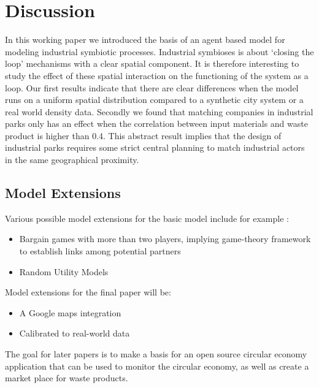 \documentclass[fleqn,10pt]{wlscirep}
\begin{document}
{%









\section*{Discussion}
In this working paper we introduced the basis of an agent based model for modeling industrial symbiotic processes. Industrial symbioses is about `closing the loop' mechanisms with a clear spatial component. It is therefore interesting to study the effect of these spatial interaction on the functioning of the system as a loop. Our first results indicate that there are clear differences when the model runs on a uniform spatial distribution compared to a synthetic city system or a real world density data. Secondly we found that matching companies in industrial parks only has an effect when the correlation between input materials and waste product is higher than 0.4. This abstract result implies that the design of industrial parks requires some strict central planning to match industrial actors in the same geographical proximity. 



\subsection*{Model Extensions}
Various possible model extensions for the basic model include for example :
\begin{itemize}
\item Bargain games with more than two players, implying game-theory framework to establish links among potential partners
\item Random Utility Models
\end{itemize}

Model extensions for the final paper will be:
\begin{itemize}
\item A Google maps integration  
\item Calibrated to real-world data
\end{itemize}

The goal for later papers is to make a basis for an open source circular economy application that can be used to monitor the circular economy, as well as create a market place for waste products.


}
\end{document}
